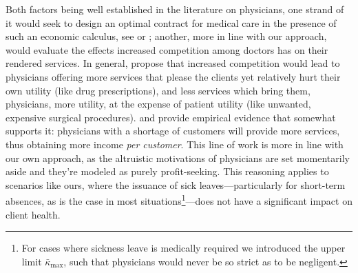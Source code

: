 \documentclass[../main.tex]{subfiles}
\begin{document}
Both factors being well established in the literature on physicians, one strand of it would seek to design an optimal contract for medical care in the presence of such an economic calculus, see \cite{chone-ma} or \cite{optimal-altruism}; another, more in line with our approach, would evaluate the effects increased competition among doctors has on their rendered services. In general, \cite{currie2023effects} propose that increased competition would lead to physicians offering more services that please the clients yet relatively hurt their own utility (like drug prescriptions), and less services which bring them, physicians, more utility, at the expense of patient utility (like unwanted, expensive surgical procedures). \cite{iversen-luras} and \cite{iversen2004} provide empirical evidence that somewhat supports it: physicians with a shortage of customers will provide more services, thus obtaining more income \textit{per customer}. This line of work is more in line with our own approach, as the altruistic motivations of physicians are set momentarily aside and they're modeled as purely profit-seeking. This reasoning applies to scenarios like ours, where the issuance of sick leaves—particularly for short-term absences, as is the case in most situations\footnote{\label{bar-kappa} For cases where sickness leave is medically required we introduced the upper limit $\bar{\kappa}_{\max}$, such that physicians would never be so strict as to be negligent.}—does not have a significant impact on client health.
\end{document}
